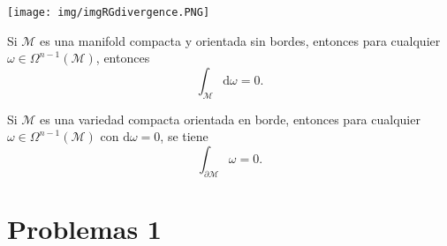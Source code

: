 \documentclass[../main]{subfiles}
\begin{document}
\begin{adjustwidth}{0pt}{-100pt}
\begin{center}
    \texttt{[image: img/imgRGdivergence.PNG]}
\end{center}

\teorema{} Si $\mathcal{M}$ es una manifold compacta y orientada sin bordes, entonces para cualquier $\omega \in \Omega^{n-1}(\mathcal{M})$, entonces 
\begin{equation}
    \int_{\mathcal{M}} \mathrm{d}\omega=0.
\end{equation}

\teorema{} Si $\mathcal{M}$ es una variedad compacta orientada en borde, entonces para cualquier $\omega \in \Omega^{n-1}(\mathcal{M})$ con $\mathrm{d}\omega=0$, se tiene 
\begin{equation}
    \int_{\partial \mathcal{M}} \omega=0.
\end{equation}
\section*{Problemas 1}


\end{adjustwidth}
\end{document}

